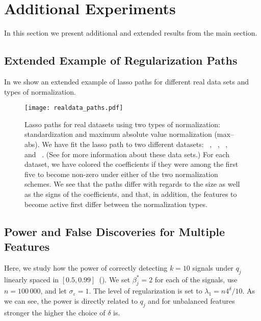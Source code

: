 \section{Additional Experiments}

In this section we present additional and extended results from the main section.

\subsection{Extended Example of Regularization Paths}%
\label{sec:extended-real-data-paths}

In  we show an extended example of lasso paths for different
real data sets and types of normalization.

\begin{figure}[hbpt]
  \centering
  \texttt{[image: realdata\_paths.pdf]}
  \caption{%
    Lasso paths for real datasets using two types of normalization:
    standardization and maximum absolute value normalization (max--abs). We have fit
    the lasso path to two different datasets:
    ~\citep{harrison1978}, ~\citep{golub1999},
    ~\citep{king}, and ~\citep{platt1998}. (See 
    for more information about these data sets.) For each
    dataset, we have colored the coefficients if they were among the first five
    to become non-zero under either of the two normalization schemes. We see
    that the paths differ with regards to the size as well as the signs of the
    coefficients, and that, in addition, the features to become active first
    differ between the normalization types.
  }
  \label{fig:realdata-paths-full}
\end{figure}

\subsection{Power and False Discoveries for Multiple Features}%
\label{sec:power-fdr-multiple}

Here, we study how the power of correctly detecting \(k=10\) signals under \(q_j\) linearly
spaced in \([0.5, 0.99]\)~(). We set \(\beta^*_j = 2\) for each of
the signals, use \(n = 100\,000\), and let \(\sigma_\varepsilon = 1\). The level of
regularization is set to \(\lambda_1 = n 4^\delta/10\). As we can see, the power is
directly related to \(q_j\) and for unbalanced features stronger the higher the choice of
\(\delta\) is.


